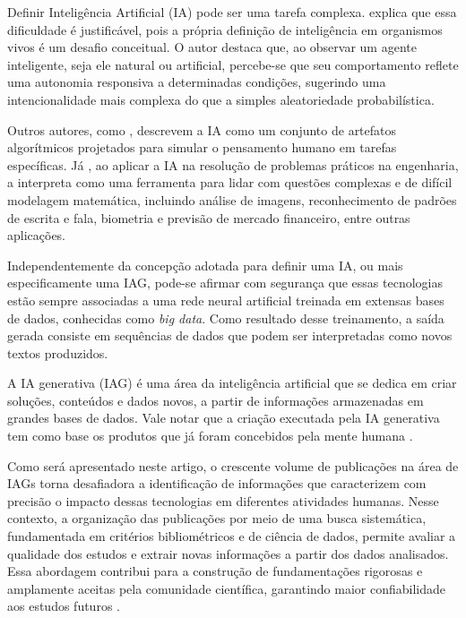 \documentclass[openany,oneside,a4paper,9pt]{extarticle}
\begin{document}
Definir Inteligência Artificial (IA) pode ser uma tarefa complexa. \textcite{lugerIA_2004} explica que essa dificuldade é justificável, pois a própria definição de inteligência em organismos vivos é um desafio conceitual. O autor destaca que, ao observar um agente inteligente, seja ele natural ou artificial, percebe-se que seu comportamento reflete uma autonomia responsiva a determinadas condições, sugerindo uma intencionalidade mais complexa do que a simples aleatoriedade probabilística.

Outros autores, como \textcite{haykin1999neural}, descrevem a IA como um conjunto de artefatos algorítmicos projetados para simular o pensamento humano em tarefas específicas. Já \textcite{silva2016redes}, ao aplicar a IA na resolução de problemas práticos na engenharia, a interpreta como uma ferramenta para lidar com questões complexas e de difícil modelagem matemática, incluindo análise de imagens, reconhecimento de padrões de escrita e fala, biometria e previsão de mercado financeiro, entre outras aplicações.

Independentemente da concepção adotada para definir uma IA, ou mais especificamente uma IAG, pode-se afirmar com segurança que essas tecnologias estão sempre associadas a uma rede neural artificial treinada em extensas bases de dados, conhecidas como \textit{big data}. Como resultado desse treinamento, a saída gerada consiste em sequências de dados que podem ser interpretadas como novos textos produzidos.

\begin{quoting}[rightmargin=0cm,leftmargin=4cm]
{\footnotesize 
\begin{singlespace}
\noindent
A IA generativa (IAG) é uma área da inteligência artificial que se 
dedica em criar soluções, conteúdos e dados novos, a partir de informações
armazenadas em grandes bases de dados. Vale notar que a criação 
executada pela IA generativa tem como base os produtos que já foram 
concebidos pela mente humana \cite[Pág. 121]{hessel2023criatividade}.
\end{singlespace}
}
\end{quoting}

Como será apresentado neste artigo, o crescente volume de publicações na área de IAGs torna desafiadora a identificação de informações que caracterizem com precisão o impacto dessas tecnologias em diferentes atividades humanas. Nesse contexto, a organização das publicações por meio de uma busca sistemática, fundamentada em critérios bibliométricos e de ciência de dados, permite avaliar a qualidade dos estudos e extrair novas informações a partir dos dados analisados. Essa abordagem contribui para a construção de fundamentações rigorosas e amplamente aceitas pela comunidade científica, garantindo maior confiabilidade aos estudos futuros \cite{ferreira2010bibliometria}.
\end{document}
